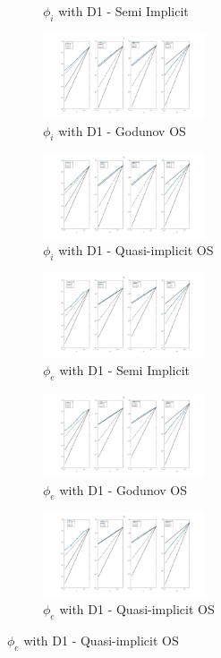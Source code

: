 \documentclass[a4paper,11pt]{article}
\begin{document}
\begin{figure}[h]
\begin{subfigure}{0.3\textwidth}
\caption*{$\phi_i$ with D1 - Semi Implicit}
\label{Phii_D1_SI}
\end{subfigure}
\begin{subfigure}{0.3\textwidth}
\includegraphics[width =4.8cm]{./D1_Phii_1_GO.jpg}
\caption*{$\phi_i$ with D1 - Godunov OS}
\label{Phii_D1_GO}
\end{subfigure}
\begin{subfigure}{0.3\textwidth}
\includegraphics[width =4.8cm]{./D1_Phii_1_OS.jpg}
\caption*{$\phi_i$ with D1 - Quasi-implicit OS}
\label{Phii_D1_OS}
\end{subfigure}
\newline
\begin{subfigure}{0.3\textwidth}
\includegraphics[width = 4.8cm]{./D1_Phie_1.jpg}
\caption*{$\phi_e$ with D1 - Semi Implicit}
\label{Phie_D1_SI}
\end{subfigure}
\begin{subfigure}{0.3\textwidth}
\includegraphics[width =4.8cm]{./D1_Phie_1_GO.jpg}
\caption*{$\phi_e$ with D1 - Godunov OS}
\label{Phie_D1_GO}
\end{subfigure}
\begin{subfigure}{0.3\textwidth}
\includegraphics[width =4.8cm]{./D1_Phie_1_OS.jpg}
\caption*{$\phi_e$ with D1 - Quasi-implicit OS}
\label{Phie_D1_OS}
\end{subfigure}
\end{figure}
\end{document}
